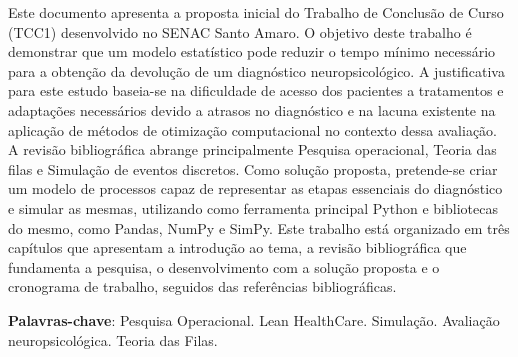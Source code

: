 \documentclass[
    12pt,                %
    openright,           %
    oneside,             %
    a4paper,             %
    english,             %
    brazil               %
]{abntex2}
\begin{document}

\frenchspacing

\pretextual

\imprimircapa

\imprimirfolhaderosto

\begin{resumo}
	Este documento apresenta a proposta inicial do Trabalho de Conclusão de Curso (TCC1) desenvolvido no SENAC Santo Amaro. O objetivo deste trabalho é demonstrar que um modelo estatístico pode reduzir o tempo mínimo necessário para a obtenção da devolução de um diagnóstico neuropsicológico. A justificativa para este estudo baseia-se na dificuldade de acesso dos pacientes a tratamentos e adaptações necessários devido a atrasos no diagnóstico e na lacuna existente na aplicação de métodos de otimização computacional no contexto dessa avaliação. A revisão bibliográfica abrange principalmente Pesquisa operacional, Teoria das filas e Simulação de eventos discretos. Como solução proposta, pretende-se criar um modelo de processos capaz de representar as etapas essenciais do diagnóstico e simular as mesmas, utilizando como ferramenta principal Python e bibliotecas do mesmo, como Pandas, NumPy e SimPy. Este trabalho está organizado em três capítulos que apresentam a introdução ao tema, a revisão bibliográfica que fundamenta a pesquisa, o desenvolvimento com a solução proposta e o cronograma de trabalho, seguidos das referências bibliográficas.

\vspace{\onelineskip}

\noindent
\textbf{Palavras-chave}: Pesquisa Operacional. Lean HealthCare. Simulação. Avaliação neuropsicológica. Teoria das Filas.
\end{resumo}

\listoffigures*
\cleardoublepage
\end{document}
